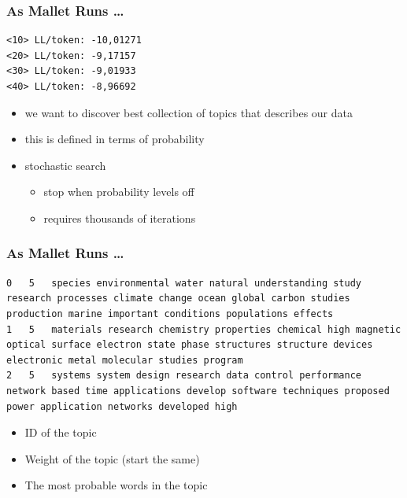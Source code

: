 \begin{frame}
\begin{columns}
  \end{columns}

\end{frame}

\begin{frame}[fragile]
  \frametitle{As Mallet Runs \dots}

  \begin{lstlisting}
<10> LL/token: -10,01271
<20> LL/token: -9,17157
<30> LL/token: -9,01933
<40> LL/token: -8,96692
  \end{lstlisting}

  \begin{itemize}
    \item we want to discover best collection of topics that describes our data
      \item this is defined in terms of probability
        \item stochastic search
          \begin{itemize}
            \item stop when probability levels off
              \item requires thousands of iterations
            \end{itemize}
    \end{itemize}

\end{frame}

\begin{frame}[fragile]
  \frametitle{As Mallet Runs \dots}

  \begin{lstlisting}
0	5	species environmental water natural understanding study research processes climate change ocean global carbon studies production marine important conditions populations effects 
1	5	materials research chemistry properties chemical high magnetic optical surface electron state phase structures structure devices electronic metal molecular studies program 
2	5	systems system design research data control performance network based time applications develop software techniques proposed power application networks developed high 
  \end{lstlisting}

  \begin{itemize}
    \item ID of the topic
    \item Weight of the topic (start the same)
    \item The most probable words in the topic
   \end{itemize}

\end{frame}

